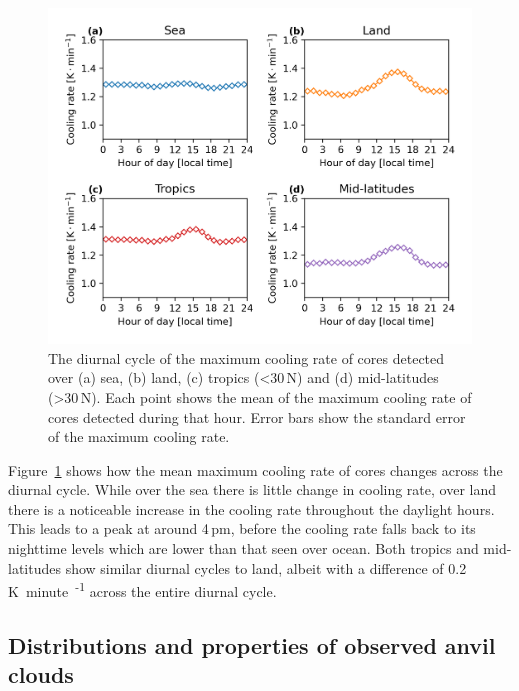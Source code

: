\begin{figure}[tp]
    \centering
    \includegraphics[width=\textwidth]{figures/chapter2_15.png}
    \caption[
    The diurnal cycle of the maximum cooling rate of cores detected over land, sea, tropics and mid-latitudes
    ]{
    The diurnal cycle of the maximum cooling rate of cores detected over (a) sea, (b) land, (c) tropics (\textless 30\,\textdegree N) and (d) mid-latitudes (\textgreater 30\,\textdegree N). Each point shows the mean of the maximum cooling rate of cores detected during that hour. Error bars show the standard error of the maximum cooling rate.
    }
    \label{fig:core_diurnal_cooling_rate}
\end{figure}

Figure~\ref{fig:core_diurnal_cooling_rate} shows how the mean maximum cooling rate of cores changes across the diurnal cycle.
While over the sea there is little change in cooling rate, over land there is a noticeable increase in the cooling rate throughout the daylight hours.
This leads to a peak at around 4\,pm, before the cooling rate falls back to its nighttime levels which are lower than that seen over ocean.
Both tropics and mid-latitudes show similar diurnal cycles to land, albeit with a difference of 0.2\,\unit{K minute\textsuperscript{-1}} across the entire diurnal cycle.


\subsection{Distributions and properties of observed anvil clouds} \label{sec:anvil_properties}

